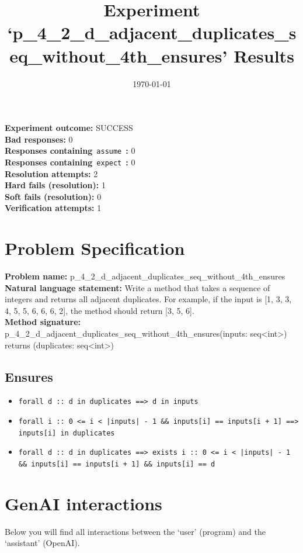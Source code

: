 \documentclass{article}
\begin{document}
\title{Experiment `p\_4\_2\_d\_adjacent\_duplicates\_seq\_without\_4th\_ensures' Results}
\author{\today}
\date{}
\maketitle
\textbf{Experiment outcome: }SUCCESS
\\\textbf{Bad responses: }0
\\\textbf{Responses containing}~\texttt{assume}~\textbf{: }0
\\\textbf{Responses containing}~\texttt{expect}~\textbf{: }0
\\\textbf{Resolution attempts: }2
\\\textbf{Hard fails (resolution): }1
\\\textbf{Soft fails (resolution): }0
\\\textbf{Verification attempts: }1
\section*{Problem Specification}
\textbf{Problem name: }p\_4\_2\_d\_adjacent\_duplicates\_seq\_without\_4th\_ensures
\\\textbf{Natural language statement: }Write a method that takes a sequence of integers and returns all adjacent duplicates. For example, if the input is [1, 3, 3, 4, 5, 5, 6, 6, 6, 2], the method should return [3, 5, 6].
\\\textbf{Method signature: }p\_4\_2\_d\_adjacent\_duplicates\_seq\_without\_4th\_ensures(inputs: seq<int>) returns (duplicates: seq<int>)
\subsection*{Ensures}
\begin{itemize}
\item \texttt{forall d :: d in duplicates ==> d in inputs}
\item \texttt{forall i :: 0 <= i < |inputs| - 1 \&\& inputs[i] == inputs[i + 1] ==> inputs[i] in duplicates}
\item \texttt{forall d :: d in duplicates ==> exists i :: 0 <= i < |inputs| - 1 \&\& inputs[i] == inputs[i + 1] \&\& inputs[i] == d}
\end{itemize}
\clearpage
\section*{GenAI interactions}
Below you will find all interactions between the `user' (program) and the `assistant' (OpenAI).
\end{document}
